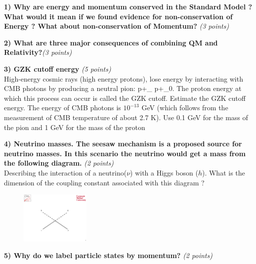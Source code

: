 {\large


\textbf{1) Why are energy and momentum conserved in the Standard Model ?  What would it mean if we found evidence for non-conservation of Energy ? What about non-conservation of Momentum? }\hfill \textit{(3 points)}\\

\vspace{3in}

\textbf{2) What are three major consequences of combining QM and Relativity?}\hfill \textit{(3 points)}\\

\vspace{3in}

\clearpage
\textbf{3)  GZK cutoff energy} \hfill \textit{(5 points)}\\
High-energy cosmic rays (high energy protons), lose energy by interacting with CMB photons by producing a neutral pion:
\be
p+\gamma_{} \rightarrow p+\pi_0.
\ee
The proton energy at which this process can occur is called the GZK cutoff. 
Estimate the GZK cutoff energy.
The energy of CMB photons is $10^{-13}$ GeV (which follows from the measurement of CMB temperature of about 2.7 K).
Use 0.1 GeV for the mass of the pion and 1 GeV for the mass of the proton

\vspace{4in}


\textbf{4) Neutrino masses. The seesaw mechanism is a proposed source for neutrino masses. In this scenario the neutrino would get a mass from the following diagram.} \hfill \textit{(2 points)}\\
Describing the interaction of a neutrino($\nu$) with a Higgs boson ($h$).
What is the dimension of the coupling constant associated with this diagram ?

\begin{figure}[h!]
\centering
\includegraphics[width=0.3\textwidth]{./NuMassDiagram.pdf}
\end{figure}


\clearpage


\textbf{5) Why do we label particle states by momentum? } \hfill \textit{(2 points)}\\

}
